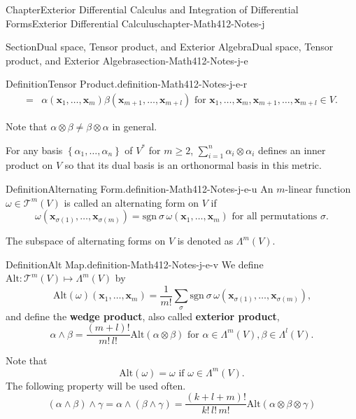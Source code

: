 \documentclass[oneside,10pt,]{book}
\newcommand{\terminology}[1]{\textbf{#1}}
\numberwithin{equation}{section}
\newcommand{\bx}{\mathbf{x}}
\newcommand{\amp}{&}
\begin{document}
\begin{chapterptx}{Chapter}{Exterior Differential Calculus and Integration of Differential Forms}{}{Exterior Differential Calculus}{}{}{chapter-Math412-Notes-j}
\begin{sectionptx}{Section}{Dual space, Tensor product, and Exterior Algebra}{}{Dual space, Tensor product, and Exterior Algebra}{}{}{section-Math412-Notes-j-e}
\begin{definition}{Definition}{Tensor Product.}{definition-Math412-Notes-j-e-r}
\begin{align*}
= \amp \alpha(\bx_{1}, \ldots, \bx_{m})\beta (\bx_{m+1},\ldots, \bx_{m+l}) 
\text{ for $\bx_{1}, \ldots, \bx_{m},\bx_{m+1},\ldots, \bx_{m+l} \in V$.}
\end{align*}
%
\end{definition}
Note that \(\alpha \otimes \beta \ne  \beta \otimes \alpha \) in general.%
\par
For any basis \(\left\{\alpha_{1},\ldots, \alpha_{n}\right\}\) of \(V^{*}\) for \(m\ge 2\), \(\sum_{i=1}^{n}\alpha_{i}\otimes \alpha_{i}\) defines an inner product on \(V\) so that its dual basis is an orthonormal basis in this metric.%
\begin{definition}{Definition}{Alternating Form.}{definition-Math412-Notes-j-e-u}%
An \(m\)-linear function \(\omega \in {\mathcal T}^{m}(V)\) is called an alternating form on \(V\) if%
\begin{equation*}
\omega({\mathbf x}_{\sigma(1)}, \ldots, {\mathbf x}_{\sigma(m)})
=\text{sgn}\ \sigma\, \omega({\mathbf x}_1, \ldots, {\mathbf x}_m) \text{ for all permutations } \sigma.
\end{equation*}
%
\par
The subspace of alternating forms on \(V\) is denoted as \(\Lambda^{m}(V)\).%
\end{definition}
\begin{definition}{Definition}{Alt Map.}{definition-Math412-Notes-j-e-v}%
We define \(\text{Alt}: {\mathcal T}^{m}(V) \mapsto \Lambda^{m}(V)\) by%
\begin{equation*}
\text{Alt}(\omega )({\mathbf x}_1, \ldots, {\mathbf x}_m) 
=\frac{1}{m!}\sum_{\sigma}\text{sgn}\ \sigma\, \omega({\mathbf x}_{\sigma(1)}, \ldots, {\mathbf x}_{\sigma(m)})\text{,}
\end{equation*}
and define the \terminology{wedge product}, also called \terminology{exterior product},%
\begin{equation*}
\alpha \wedge \beta =\frac{(m+l)!}{m!\, l!} \text{Alt}(\alpha \otimes \beta) \text{ for }
\alpha \in {\Lambda}^{m}(V), \beta \in {\Lambda}^{l}(V). 
\end{equation*}
%
\end{definition}
Note that%
\begin{equation*}
\text{Alt}(\omega )= \omega \text{ if $\omega \in {\Lambda}^{m}(V)$.}
\end{equation*}
The following property will be used often.%
\begin{equation}
\left(\alpha \wedge \beta \right)\wedge \gamma =\alpha \wedge  \left(\beta \wedge \gamma \right)
=\frac{(k+l+m)!}{k!\, l!\, m!} \text{Alt}(\alpha\otimes \beta \otimes \gamma)\label{men-eq-extprod}

\end{equation}
\end{sectionptx}
\end{chapterptx}
\end{document}

